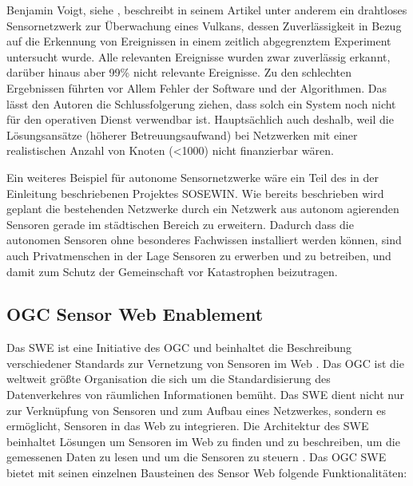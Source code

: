 Benjamin Voigt, siehe \citep{voigt_illustration_2013}, beschreibt in seinem Artikel unter anderem ein drahtloses Sensornetzwerk zur Überwachung eines Vulkans, dessen Zuverlässigkeit in Bezug auf die Erkennung von Ereignissen in einem zeitlich abgegrenztem Experiment untersucht wurde. Alle relevanten Ereignisse wurden zwar zuverlässig erkannt, darüber hinaus aber 99\%  nicht relevante Ereignisse. Zu den schlechten Ergebnissen führten vor Allem Fehler der Software und der Algorithmen. Das lässt den Autoren die Schlussfolgerung ziehen, dass solch ein System noch nicht für den operativen Dienst verwendbar ist. Hauptsächlich auch deshalb, weil die Lösungsansätze (höherer Betreuungsaufwand) bei Netzwerken mit einer realistischen Anzahl von Knoten (<1000) nicht finanzierbar wären.

Ein weiteres Beispiel für autonome Sensornetzwerke wäre ein Teil des in der Einleitung beschriebenen Projektes \gls{SOSEWIN}. Wie bereits beschrieben wird geplant die bestehenden Netzwerke durch ein Netzwerk aus autonom agierenden Sensoren gerade im städtischen Bereich zu erweitern. Dadurch dass die autonomen Sensoren ohne besonderes Fachwissen installiert werden können, sind auch Privatmenschen in der Lage Sensoren zu erwerben und zu betreiben, und damit zum Schutz der Gemeinschaft vor Katastrophen beizutragen.

\subsection{OGC Sensor Web Enablement}
Das  \gls{SWE} ist eine Initiative des  \gls{OGC} und beinhaltet die Beschreibung verschiedener Standards zur Vernetzung von Sensoren im Web \citep{botts_ogc_2008}\citep{bermudez_ogc_2011}. Das \gls{OGC} ist die weltweit größte Organisation die sich um die Standardisierung des Datenverkehres von räumlichen Informationen bemüht. Das \gls{SWE} dient nicht nur zur Verknüpfung von Sensoren und zum Aufbau eines Netzwerkes, sondern es ermöglicht, Sensoren in das Web zu integrieren. Die Architektur des \gls{SWE} beinhaltet Lösungen um Sensoren im Web zu finden und zu beschreiben, um die gemessenen Daten zu lesen und um die Sensoren zu steuern \citep{botts_ogc_2008}\citep{broring_new_2011}. Das \gls{OGC} \gls{SWE} bietet mit seinen einzelnen Bausteinen des Sensor Web folgende Funktionalitäten:

